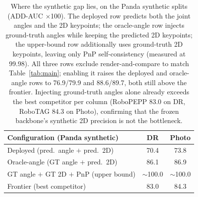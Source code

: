 \begin{table}[t!]
\centering
\renewcommand{\arraystretch}{1.1}
\setlength{\tabcolsep}{6pt}
\begin{tabular}{@{} l cc @{}}
\toprule
\textbf{Configuration (Panda synthetic)} & \textbf{DR} & \textbf{Photo} \\
\midrule
Deployed (pred.\ angle $+$ pred.\ 2D) & 70.4 & 73.8 \\
Oracle-angle (GT angle $+$ pred.\ 2D) & 86.1 & 86.9 \\
GT angle $+$ GT 2D $+$ PnP (upper bound) & $\sim$100.0 & $\sim$100.0 \\
\midrule
Frontier (best competitor) & 83.0 & 84.3 \\
\bottomrule
\end{tabular}
\caption{Where the synthetic gap lies, on the Panda synthetic splits (ADD-AUC $\times$100). The deployed row predicts both the joint angles and the 2D keypoints; the oracle-angle row injects ground-truth angles while keeping the predicted 2D keypoints; the upper-bound row additionally uses ground-truth 2D keypoints, leaving only PnP self-consistency (measured at 99.98). All three rows exclude render-and-compare to match Table~\ref{tab:main}; enabling it raises the deployed and oracle-angle rows to 76.9/79.9 and 88.6/89.7, both still above the frontier. Injecting ground-truth angles alone already exceeds the best competitor per column (RoboPEPP 83.0 on DR, RoboTAG 84.3 on Photo), confirming that the frozen backbone's synthetic 2D precision is not the bottleneck.}
\label{tab:synthgap}
\end{table}

